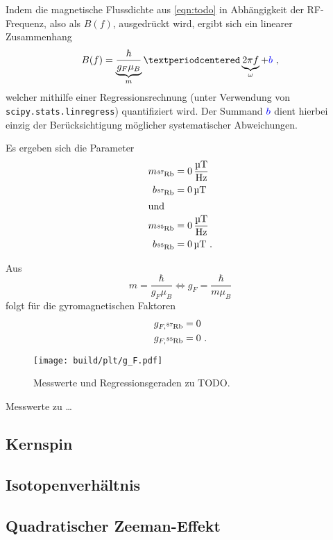 Indem die magnetische Flussdichte aus \autoref{eqn:todo}
in Abhängigkeit der RF-Frequenz, also als $B(f)$, ausgedrückt wird,
ergibt sich ein linearer Zusammenhang
\begin{equation*}
    B(f) = \underbrace{\frac{\hbar}{g_F \mu_B}}_m · \underbrace{2\pi f}_\omega
    + {\color{blue} b} \ ,
\end{equation*}
welcher mithilfe einer Regressionsrechnung
(unter Verwendung von \texttt{scipy.stats.linregress})
quantifiziert wird.
Der Summand $\color{blue} b$ dient hierbei einzig der Berücksichtigung möglicher systematischer Abweichungen.

Es ergeben sich die Parameter
\begin{align*}
    m_{\Rb{87}} &= \SI{0}{\micro\tesla\per\hertz} \\
    b_{\Rb{87}} &= \SI{0}{\micro\tesla} \\
    \intertext{und}
    m_{\Rb{85}} &= \SI{0}{\micro\tesla\per\hertz} \\
    b_{\Rb{85}} &= \SI{0}{\micro\tesla} \ .
\end{align*}


Aus
\[
    m = \frac{\hbar}{g_F \mu_B}
    \Leftrightarrow
    g_F = \frac{\hbar}{m \mu_B}
\]
folgt für die gyromagnetischen Faktoren
\begin{align*}
    g_{F, \Rb{87}} &= \SI{0}{} \\
    g_{F, \Rb{85}} &= \SI{0}{} \ .
\end{align*}


\begin{figure}
    \centering
    \texttt{[image: build/plt/g\_F.pdf]}
    \caption{Messwerte und Regressionsgeraden zu TODO.}
    \label{fig:plt:g_F}
\end{figure}

\begin{table}
    \centering
    \caption{Messwerte zu …}
    \label{tab:lande_ab}
\end{table}

\subsection{Kernspin}


\subsection{Isotopenverhältnis}


\subsection{Quadratischer Zeeman-Effekt}
